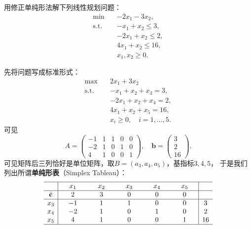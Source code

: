 \documentclass{../mathnotes-art}
\renewcommand{\c}{\mathbf{c}}
\renewcommand{\b}{\mathbf{b}}
\begin{document}
\begin{problem}
    用修正单纯形法解下列线性规划问题：
    \[
        \begin{aligned}
            \min\quad & -2x_1 - 3x_2, \\
            \text{s.t.}\quad & -x_1 + x_2 \le 3, \\
            & -2x_1 + x_2 \le 2, \\
            & 4x_1 + x_2 \le 16, \\
            & x_1, x_2 \ge 0.
        \end{aligned}
    \]
\end{problem}
先将问题写成标准形式：
\[
    \begin{aligned}
        \max\quad & 2x_1 + 3x_2 \\
        \text{s.t.}\quad
        & -x_1 + x_2 + x_3 = 3, \\
        & -2x_1 + x_2 + x_4 = 2, \\
        & 4x_1 + x_2 + x_5 = 16, \\
        & x_i \geq 0,\quad i=1,\dots,5.
    \end{aligned}
\]
可见
\[
    A =
    \begin{pmatrix}
        -1 & 1 & 1 & 0 & 0 \\
        -2 & 1 & 0 & 1 & 0 \\
        4 & 1 & 0 & 0 & 1
    \end{pmatrix},
    \quad
    \b =
    \begin{pmatrix}
        3 \\ 2 \\ 16
    \end{pmatrix}.
\]
可见矩阵后三列恰好是单位矩阵，取\(B = (a_{3},a_{4},a_{5})\)，基指标\({3,4,5}\)，
于是我们列出所谓\textbf{单纯形表}（Simplex Tableau）：
\[
    \begin{array}{c|*{5}{>{\hspace{1em}}c<{\hspace{1em}}}|c}
        \hline
        & x_1 & x_2 & x_3 & x_4 & x_5 &    \\ \hline
        \bar{\c} & 2  & 3  & 0   & 0   & 0   &    \\ \hline
        x_{3} & -1  & 1   & 1   & 0   & 0   & 3  \\
        x_{4} & -2  & 1   & 0   & 1   & 0   & 2  \\
        x_{5} & 4   & 1   & 0   & 0   & 1   & 16 \\ \hline
    \end{array}
\]
\end{document}
